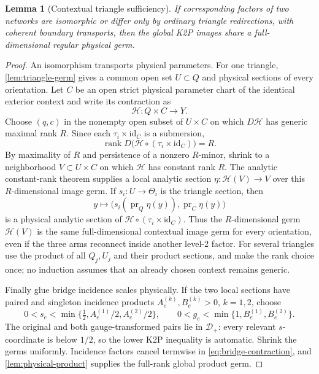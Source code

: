 \documentclass[11pt]{article}
\newtheorem{lemma}[theorem]{Lemma}
\theoremstyle{remark}
\newcommand{\Dplus}{\mathcal D_+}
\newcommand{\1}{\mathbf 1}
\begin{document}
\begin{lemma}[Contextual triangle sufficiency]\label{lem:context-triangle}
If corresponding factors of two networks are isomorphic or differ only by
ordinary triangle redirections, with coherent boundary transports, then the
global K2P images share a full-dimensional regular physical germ.
\end{lemma}

\begin{proof}
An isomorphism transports physical parameters.  For one triangle,
\cref{lem:triangle-germ} gives a common open set \(U\subset Q\) and physical
sections of every orientation.  Let \(C\) be an open strict physical
parameter chart of the identical exterior context and write its contraction
as
\[
 \mathcal H:Q\times C\longrightarrow Y.
\]
Choose \((q,c)\) in the nonempty open subset of \(U\times C\) on which
\(D\mathcal H\) has generic maximal rank \(R\).  Since each
\(\tau_i\times\mathrm{id}_C\) is a submersion,
\[
 \operatorname{rank}D\bigl(\mathcal H\circ
 (\tau_i\times\mathrm{id}_C)\bigr)=R.
\]
By maximality of \(R\) and persistence of a nonzero \(R\)-minor, shrink to a
neighborhood \(V\subset U\times C\) on which \(\mathcal H\) has constant rank
\(R\).  The analytic constant-rank theorem supplies a local analytic section
\(\eta:\mathcal H(V)\to V\) over this \(R\)-dimensional image germ.  If
\(s_i:U\to\Theta_i\) is the triangle section, then
\[
 y\longmapsto
 \bigl(s_i(\operatorname{pr}_Q\eta(y)),
       \operatorname{pr}_C\eta(y)\bigr)
\]
is a physical analytic section of
\(\mathcal H\circ(\tau_i\times\mathrm{id}_C)\).  Thus the
\(R\)-dimensional germ \(\mathcal H(V)\) is the same full-dimensional
contextual image germ for every orientation, even if the three arms reconnect
inside another level-2 factor.  For several triangles use the product of all
\(Q_j,U_j\) and their
product sections, and make the rank choice once; no induction assumes that
an already chosen context remains generic.

Finally glue bridge incidence scales physically.  If the two local sections
have paired and singleton incidence products \(A_e^{(k)},B_e^{(k)}>0\),
\(k=1,2\), choose
\[
 0<s_e<\min\{\tfrac12,A_e^{(1)}/2,A_e^{(2)}/2\},\qquad
 0<g_e<\min\{1,B_e^{(1)},B_e^{(2)}\}.
\]
The original and both gauge-transformed pairs lie in \(\Dplus\): every
relevant \(s\)-coordinate is below \(1/2\), so the lower K2P inequality is
automatic.  Shrink the germs uniformly.  Incidence factors cancel termwise
in \eqref{eq:bridge-contraction}, and \cref{lem:physical-product} supplies the
full-rank global product germ.
\end{proof}
\end{document}
